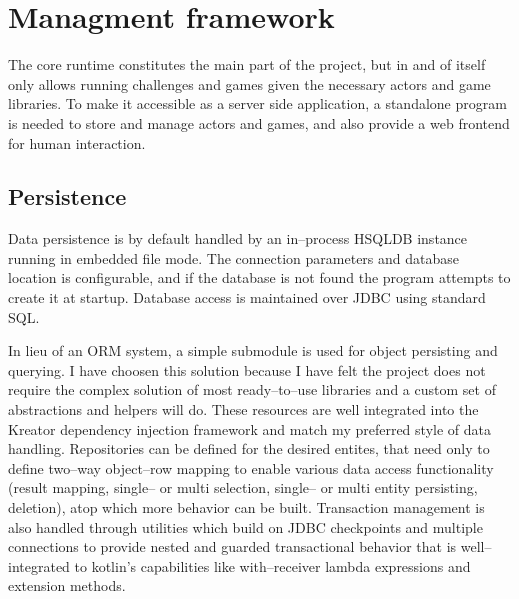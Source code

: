 





%

\chapter{Managment framework}\label{sect:Web}

The core runtime constitutes the main part of the project, but in and of itself only allows running challenges and games given the necessary actors and game libraries. To make it accessible as a server side application, a standalone program is needed to store and manage actors and games, and also provide a web frontend for human interaction.

	\section{Persistence}
	
	Data persistence is by default handled by an in--process HSQLDB instance running in embedded file mode. The connection parameters and database location is configurable, and if the database is not found the program attempts to create it at startup. Database access is maintained over JDBC using standard SQL.
		
	In lieu of an ORM system, a simple submodule is used for object persisting and querying. I have choosen this solution because I have felt the project does not require the complex solution of most ready--to--use libraries and a custom set of abstractions and helpers will do. These resources are well integrated into the Kreator dependency injection framework and match my preferred style of data handling. Repositories can be defined for the desired entites, that need only to define two--way object--row mapping to enable various data access functionality (result mapping, single-- or multi selection, single-- or multi entity persisting, deletion), atop which more behavior can be built. Transaction management is also handled through utilities which build on JDBC checkpoints and multiple connections to provide nested and guarded transactional behavior that is well--integrated to kotlin's capabilities like with--receiver lambda expressions and extension methods.

